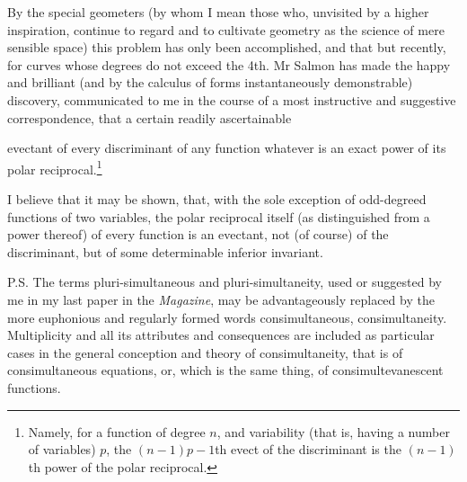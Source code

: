 \documentclass[11pt]{article}
\newcommand{\sourcepage}[1]{\marginpar{\scriptsize p.~#1}}
\begin{document}
By the special geometers (by whom I mean those who, unvisited by a higher inspiration, continue to regard and to cultivate geometry as the science of mere sensible space) this problem has only been accomplished, and that but recently, for curves whose degrees do not exceed the 4th. Mr Salmon has made the happy and brilliant (and by the calculus of forms instantaneously demonstrable) discovery, communicated to me in the course of a most instructive and suggestive correspondence, that a certain readily ascertainable

\sourcepage{377}
evectant of every discriminant of any function whatever is an exact power of its polar reciprocal.\footnote{Namely, for a function of degree $n$, and variability (that is, having a number of variables) $p$, the $(n-1)p-1$th evect of the discriminant is the $(n-1)$th power of the polar reciprocal.}

I believe that it may be shown, that, with the sole exception of odd-degreed functions of two variables, the polar reciprocal itself (as distinguished from a power thereof) of every function is an evectant, not (of course) of the discriminant, but of some determinable inferior invariant.

P.S. The terms pluri-simultaneous and pluri-simultaneity, used or suggested by me in my last paper in the \emph{Magazine}, may be advantageously replaced by the more euphonious and regularly formed words consimultaneous, consimultaneity. Multiplicity and all its attributes and consequences are included as particular cases in the general conception and theory of consimultaneity, that is of consimultaneous equations, or, which is the same thing, of consimultevanescent functions.
\end{document}
